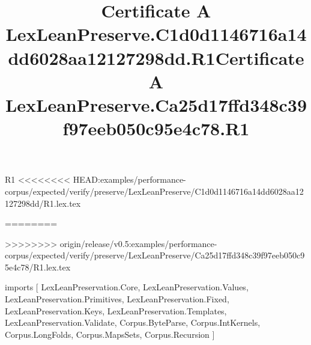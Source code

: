\begin{lexlean}{R1}
<<<<<<<< HEAD:examples/performance-corpus/expected/verify/preserve/LexLeanPreserve/C1d0d1146716a14dd6028aa12127298dd/R1.lex.tex
\title{Certificate A LexLeanPreserve.C1d0d1146716a14dd6028aa12127298dd.R1}
========
\title{Certificate A LexLeanPreserve.Ca25d17ffd348c39f97eeb050c95e4c78.R1}
>>>>>>>> origin/release/v0.5:examples/performance-corpus/expected/verify/preserve/LexLeanPreserve/Ca25d17ffd348c39f97eeb050c95e4c78/R1.lex.tex
\begin{coremodule}
imports [
  LexLeanPreservation.Core,
  LexLeanPreservation.Values,
  LexLeanPreservation.Primitives,
  LexLeanPreservation.Fixed,
  LexLeanPreservation.Keys,
  LexLeanPreservation.Templates,
  LexLeanPreservation.Validate,
  Corpus.ByteParse,
  Corpus.IntKernels,
  Corpus.LongFolds,
  Corpus.MapsSets,
  Corpus.Recursion
]


\end{coremodule}
\end{lexlean}
